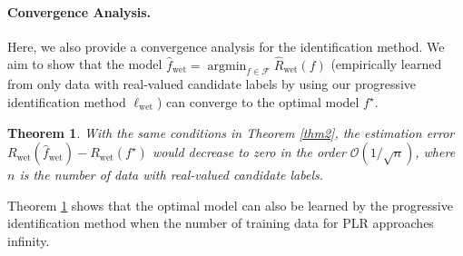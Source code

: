 \documentclass[letterpaper]{article} %
\newtheorem{thm}{Theorem}
\newcommand{\argmin}{\mathop{\arg\min}}
\begin{document}
\paragraph{Convergence Analysis.} Here, we also provide a convergence analysis for the identification method. We aim to show that the model $\widehat{f}_{\mathrm{wet}}=\argmin_{f\in\mathcal{F}}\widehat{R}_{\mathrm{wet}}(f)$ (empirically learned from only data with real-valued candidate labels by using our progressive identification method $\ell_{\mathrm{wet}}$) can converge to the optimal model $f^\star$.
\begin{thm}
\label{thm4}
With the same conditions in Theorem \ref{thm2}, the estimation error $R_{\mathrm{wet}}(\widehat{f}_{\mathrm{wet}})-R_{\mathrm{wet}}(f^\star)$ would decrease to zero in the order $\mathcal{O}({1}/{\sqrt{n}})$, where $n$ is the number of data with real-valued candidate labels.
\end{thm}
Theorem \ref{thm4} shows that the optimal model can also be learned by the progressive identification method when the number of training data for PLR approaches infinity.
\end{document}
